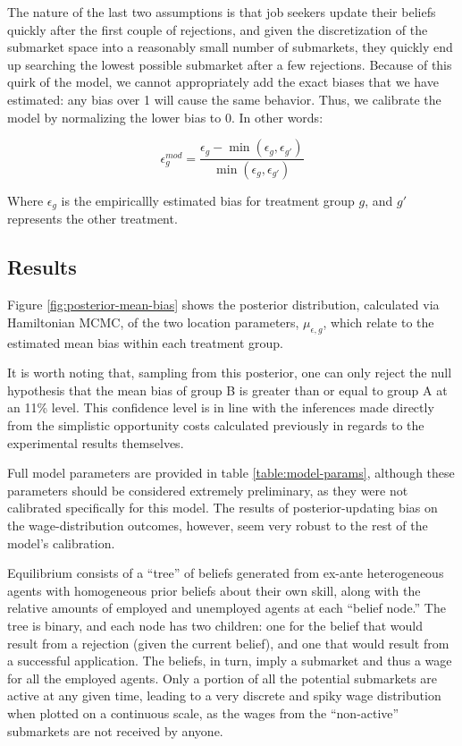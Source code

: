 \documentclass[a4paper,12pt]{article}
\begin{document}
The nature of the last two assumptions is that job seekers update their beliefs quickly after the first couple of rejections, and given the discretization of the submarket space into a reasonably small number of submarkets, they quickly end up searching the lowest possible submarket after a few rejections. Because of this quirk of the model, we cannot appropriately add the exact biases that we have estimated: any bias over 1 will cause the same behavior. Thus, we calibrate the model by normalizing the lower bias to 0. In other words:

\begin{equation} \label {eq:epsilon-model}
\epsilon^{mod}_{g} = \frac{\epsilon_g - \min(\epsilon_g, \epsilon_{g'})}{\min (\epsilon_g, \epsilon_{g'})}
\end{equation}

Where $\epsilon_{g}$ is the empiricallly estimated bias for treatment group $g$, and $g'$ represents the other treatment.

\subsection{ Results }

Figure \ref{fig:posterior-mean-bias} shows the posterior distribution, calculated via Hamiltonian MCMC, of the two location parameters, $\mu_{\epsilon, g}$, which relate to the estimated mean bias within each treatment group.

It is worth noting that, sampling from this posterior, one can only reject the null hypothesis that the mean bias of group B is greater than or equal to group A at an 11\% level. This confidence level is in line with the inferences made directly from the simplistic opportunity costs calculated previously in regards to the experimental results themselves.

Full model parameters are provided in table \ref{table:model-params}, although these parameters should be considered extremely preliminary, as they were not calibrated specifically for this model. The results of posterior-updating bias on the wage-distribution outcomes, however, seem very robust to the rest of the model's calibration.

Equilibrium consists of a ``tree'' of beliefs generated from ex-ante heterogeneous agents with homogeneous prior beliefs about their own skill, along with the relative amounts of employed and unemployed agents at each ``belief node.'' The tree is binary, and each node has two children: one for the belief that would result from a rejection (given the current belief), and one that would result from a successful application. The beliefs, in turn, imply a submarket and thus a wage for all the employed agents. Only a portion of all the potential submarkets are active at any given time, leading to a very discrete and spiky wage distribution when plotted on a continuous scale, as the wages from the ``non-active'' submarkets are not received by anyone.
\end{document}
